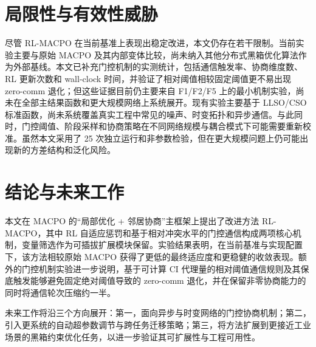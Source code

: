 \documentclass[conference]{IEEEtran}
\begin{document}
\section{局限性与有效性威胁}

尽管 RL-MACPO 在当前基准上表现出稳定改进，本文仍存在若干限制。当前实验主要与原始 MACPO 及其内部变体比较，尚未纳入其他分布式黑箱优化算法作为外部基线。本文已补充门控机制的实测统计，包括通信触发率、协商维度数、RL 更新次数和 wall-clock 时间，并验证了相对阈值相较固定阈值更不易出现 zero-comm 退化；但这些证据目前仍主要来自 F1/F2/F5 上的最小机制实验，尚未在全部主结果函数和更大规模网络上系统展开。现有实验主要基于 LLSO/CSO 标准函数，尚未系统覆盖真实工程中常见的噪声、时变拓扑和异步通信。与此同时，门控阈值、阶段采样和协商策略在不同网络规模与耦合模式下可能需要重新校准。虽然本文采用了 25 次独立运行和非参数检验，但在更大规模问题上仍可能出现新的方差结构和泛化风险。

\section{结论与未来工作}

本文在 MACPO 的“局部优化 + 邻居协商”主框架上提出了改进方法 RL-MACPO，其中 RL 自适应惩罚和基于相对冲突水平的门控通信构成两项核心机制，变量筛选作为可插拔扩展模块保留。实验结果表明，在当前基准与实现配置下，该方法相较原始 MACPO 获得了更低的最终适应度和更稳健的收敛表现。额外的门控机制实验进一步说明，基于可计算 CI 代理量的相对阈值通信规则及其保底触发能够避免固定绝对阈值导致的 zero-comm 退化，并在保留非零协商能力的同时将通信轮次压缩约一半。

未来工作将沿三个方向展开：第一，面向异步与时变网络的门控协商机制；第二，引入更系统的自动超参数调节与跨任务迁移策略；第三，将方法扩展到更接近工业场景的黑箱约束优化任务，以进一步验证其可扩展性与工程可用性。
\end{document}
